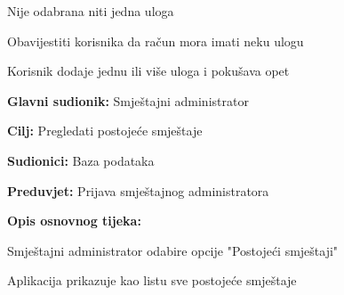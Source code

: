 \begin{packed_item}
\begin{packed_item}
\begin{packed_enum}
						\end{packed_enum}
						\item[2.c] Nije odabrana niti jedna uloga
						\item[] \begin{packed_enum}
							
							\item Obavijestiti korisnika da račun mora imati neku ulogu
							\item Korisnik dodaje jednu ili više uloga i pokušava opet
							
						\end{packed_enum}
						
					\end{packed_item}
				\end{packed_item}
				
				\noindent {}
				\begin{packed_item}
					
					\item \textbf{Glavni sudionik: }Smještajni administrator
					\item  \textbf{Cilj:} Pregledati postojeće smještaje
					\item  \textbf{Sudionici:} Baza podataka
					\item  \textbf{Preduvjet:} Prijava smještajnog administratora
					\item  \textbf{Opis osnovnog tijeka:}
					
					\item[] \begin{packed_enum}
						
						\item Smještajni administrator odabire opcije "Postojeći smještaji"
						\item Aplikacija prikazuje kao listu sve postojeće smještaje
					\end{packed_enum}

				\end{packed_item}
				
